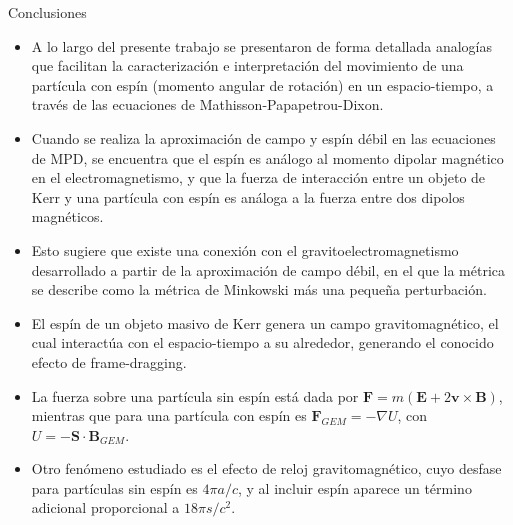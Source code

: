 \documentclass[aspectratio=169,10pt,usenames,dvipsnames,spanish]{beamer}
\begin{document}

\begin{frame}{Conclusiones}

\begin{itemize}

\item A lo largo del presente trabajo se presentaron de forma detallada analogías que facilitan la caracterización e interpretación del movimiento de una partícula con espín (momento angular de rotación) en un espacio-tiempo, a través de las ecuaciones de Mathisson-Papapetrou-Dixon.

\item Cuando se realiza la aproximación de campo y espín débil en las ecuaciones de MPD, se encuentra que el espín es análogo al momento dipolar magnético en el electromagnetismo, y que la fuerza de interacción entre un objeto de Kerr y una partícula con espín es análoga a la fuerza entre dos dipolos magnéticos.

\item Esto sugiere que existe una conexión con el gravitoelectromagnetismo desarrollado a partir de la aproximación de campo débil, en el que la métrica se describe como la métrica de Minkowski más una pequeña perturbación.

\item El espín de un objeto masivo de Kerr genera un campo gravitomagnético, el cual interactúa con el espacio-tiempo a su alrededor, generando el conocido efecto de frame-dragging.

\item La fuerza sobre una partícula sin espín está dada por $\mathbf{F}=m(\mathbf{E}+2\mathbf{v}\times\mathbf{B})$, mientras que para una partícula con espín es $\mathbf{F}_{GEM}=-\nabla U$, con $U=-\mathbf{S} \cdot \mathbf{B}_{GEM}$.

\item Otro fenómeno estudiado es el efecto de reloj gravitomagnético, cuyo desfase para partículas sin espín es $4\pi a/c$, y al incluir espín aparece un término adicional proporcional a $18\pi s/c^2$.

\end{itemize}

\end{frame}
\end{document}
